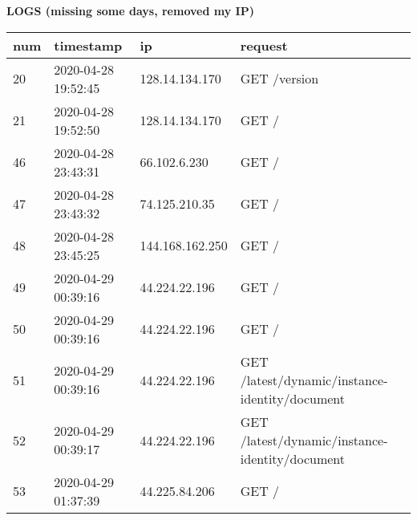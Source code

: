 \documentclass[12pt]{article}
\begin{document}
\begin{center}
\vspace*{0.1cm}
\Large{\textbf{LOGS (missing some days, removed my IP)}}
\end{center}
\begin{longtable}{|l|l|l|l|}
\hline
\textbf{num} & \textbf{timestamp} & \textbf{ip} & \textbf{request} \\ \hline
20  & 2020-04-28 19:52:45 & 128.14.134.170  & GET /version                                                                                                                        \\ \hline
21  & 2020-04-28 19:52:50 & 128.14.134.170  & GET /                                                                                                                               \\ \hline
46  & 2020-04-28 23:43:31 & 66.102.6.230    & GET /                                                                                                                               \\ \hline
47  & 2020-04-28 23:43:32 & 74.125.210.35   & GET /                                                                                                                               \\ \hline
48  & 2020-04-28 23:45:25 & 144.168.162.250 & GET /                                                                                                                               \\ \hline
49  & 2020-04-29 00:39:16 & 44.224.22.196   & GET /                                                                                                                               \\ \hline
50  & 2020-04-29 00:39:16 & 44.224.22.196   & GET /                                                                                                                               \\ \hline
51  & 2020-04-29 00:39:16 & 44.224.22.196   & GET /latest/dynamic/instance-identity/document                                                                                      \\ \hline
52  & 2020-04-29 00:39:17 & 44.224.22.196   & GET /latest/dynamic/instance-identity/document                                                                                      \\ \hline
53  & 2020-04-29 01:37:39 & 44.225.84.206   & GET /                                                                                                                               \\ \hline

\end{longtable}
\end{document}
